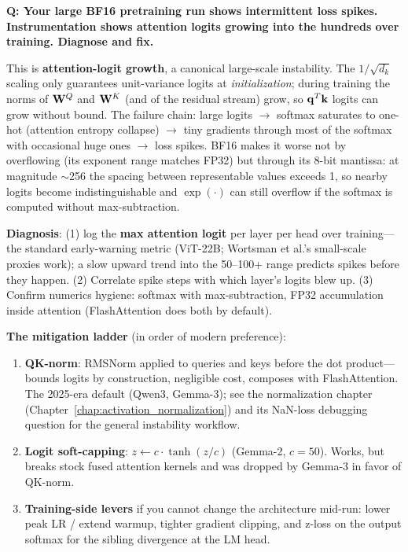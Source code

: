 \begin{interviewq}
\textbf{Q: Your large BF16 pretraining run shows intermittent loss spikes. Instrumentation shows attention logits growing into the hundreds over training. Diagnose and fix.}

 \quad {} \quad \badgefreq{\freqhigh}

\stronganswer This is \textbf{attention-logit growth}, a canonical large-scale instability. The $1/\sqrt{d_k}$ scaling only guarantees unit-variance logits at \textit{initialization}; during training the norms of $\mathbf{W}^Q$ and $\mathbf{W}^K$ (and of the residual stream) grow, so $\mathbf{q}^T\mathbf{k}$ logits can grow without bound. The failure chain: large logits $\to$ softmax saturates to one-hot (attention entropy collapse) $\to$ tiny gradients through most of the softmax with occasional huge ones $\to$ loss spikes. BF16 makes it worse not by overflowing (its exponent range matches FP32) but through its 8-bit mantissa: at magnitude $\sim$256 the spacing between representable values exceeds 1, so nearby logits become indistinguishable and $\exp(\cdot)$ can still overflow if the softmax is computed without max-subtraction.

\textbf{Diagnosis}: (1) log the \textbf{max attention logit} per layer per head over training---the standard early-warning metric (ViT-22B; Wortsman et al.'s small-scale proxies work); a slow upward trend into the 50--100+ range predicts spikes before they happen. (2) Correlate spike steps with which layer's logits blew up. (3) Confirm numerics hygiene: softmax with max-subtraction, FP32 accumulation inside attention (FlashAttention does both by default).

\textbf{The mitigation ladder} (in order of modern preference):
\begin{enumerate}
    \item \textbf{QK-norm}: RMSNorm applied to queries and keys before the dot product---bounds logits by construction, negligible cost, composes with FlashAttention. The 2025-era default (Qwen3, Gemma-3); see the normalization chapter (Chapter~\ref{chap:activation_normalization}) and its NaN-loss debugging question for the general instability workflow.
    \item \textbf{Logit soft-capping}: $z \leftarrow c \cdot \tanh(z/c)$ (Gemma-2, $c{=}50$). Works, but breaks stock fused attention kernels and was dropped by Gemma-3 in favor of QK-norm.
    \item \textbf{Training-side levers} if you cannot change the architecture mid-run: lower peak LR / extend warmup, tighter gradient clipping, and z-loss on the output softmax for the sibling divergence at the LM head.
\end{enumerate}


\end{interviewq}
